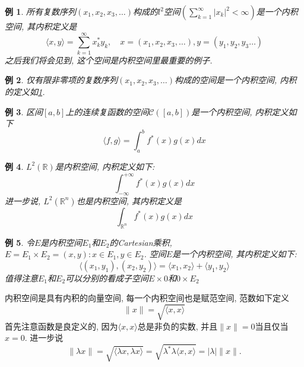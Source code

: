 \documentclass[a4paper,11pt]{article}
\theoremstyle{mystyle}
\newtheorem{example}{\hspace{2em}例}[section]
\begin{document}
\begin{example}\label{l^2 inner space}
  所有复数序列$(x_1,x_2,x_3,\dots)$构成的$l^2$空间$(\sum_{k=1}^{\infty}|x_k|^2<\infty)$是一个内积空间, 其内积定义是
  \begin{equation*}
    \langle x,y\rangle=\sum_{k=1}^{\infty}x_k^*y_k,\quad x=(x_1,x_2,x_3,\dots),y=(y_1,y_2,y_3\dots)
  \end{equation*}
  之后我们将会见到, 这个空间是内积空间里最重要的例子.
\end{example}
\begin{example}\label{nonzero term}
  仅有限非零项的复数序列$(x_1,x_2,x_3,\dots)$构成的空间是一个内积空间, 内积的定义如\ref{l^2 inner space}.
\end{example}
\begin{example}\label{C[a,b]inner}
  区间$[a,b]$上的连续复函数的空间$\mathcal{C}([a,b])$是一个内积空间, 内积定义如下
  \begin{equation*}
    \langle f,g\rangle=\int_{a}^{b}f^*(x)g(x)dx
  \end{equation*}
\end{example}
\begin{example}
  $L^2(\mathbb{R})$是内积空间, 内积定义如下:
  \begin{equation*}
    \int_{-\infty}^{+\infty}f^*(x)g(x)dx
  \end{equation*}
  进一步说, $L^2(\mathbb{R}^n)$也是内积空间, 其内积定义是
  \begin{equation*}
    \int_{\mathbb{R}^n}f^*(x)g(x)dx
  \end{equation*}
\end{example}
\begin{example}
  令$E$是内积空间$E_1$和$E_2$的Cartesian乘积, $E=E_1\times E_2={(x,y):x\in E_1,y\in E_2}$. 空间$E$是一个内积空间, 其内积定义如下:
  \begin{equation*}
    \langle(x_1,y_1),(x_2,y_2)\rangle=\langle x_1,x_2\rangle+\langle y_1,y_2\rangle
  \end{equation*}
  值得注意$E_1$和$E_2$可以分别的看成子空间$E\times{0}$和${0}\times E_2$
\end{example}
内积空间是具有内积的向量空间, 每一个内积空间也是赋范空间, 范数如下定义
\begin{equation*}
  \|x\|=\sqrt{\langle x,x\rangle}
\end{equation*}
首先注意函数是良定义的, 因为$\langle x,x\rangle$总是非负的实数, 并且$\|x\|=0$当且仅当$x=0$. 进一步说
\begin{equation*}
  \|\lambda x\|=\sqrt{\langle\lambda x,\lambda x\rangle}=\sqrt{\lambda^*\lambda\langle x,x\rangle}=|\lambda|\|x\|.
\end{equation*}
\end{document}
